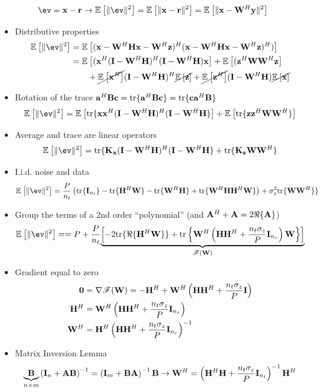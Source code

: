 \documentclass[xcolor=dvipsnames,aspectratio=169]{beamer}
\begin{document}
{    \vspace{-.1in}
    \begin{definition}
     $$\ev=\x-\rr\to\Ex{}{\|\ev\|^2}=\Ex{}{\|\x-\rr\|^2}=\Ex{}{\|\x-\W^H\y\|^2}$$
    \end{definition}
    \begin{itemize}
     \item Distributive properties
     \begin{equation*}
        \begin{split}
        \Ex{}{\|\ev\|^2}&=\Ex{}{(\x-\W^H\Hb\x-\W^H\z)^H(\x-\W^H\Hb\x-\W^H\z)^H)}\\
                        &=\Ex{}{(\x^H(\I-\W^H\Hb)^H(\I-\W^H\Hb)\x}+\Ex{}{(\z^H\W\W^H\z}\\
                        &\qquad+\cancel{\Ex{}{\x^H}}(\I-\W^H\Hb)^H\cancel{\Ex{}{\z}}+\cancel{\Ex{}{\z^H}}(\I-\W^H\Hb)\cancel{\Ex{}{\x}}\\
        \end{split}
     \end{equation*}
     \item Rotation of the trace $\mathbf{a}^H\mathbf{B}\mathbf{c}=\textnormal{tr}\{\mathbf{a}^H\mathbf{B}\mathbf{c}\}=\textnormal{tr}\{\mathbf{c}\mathbf{a}^H\mathbf{B}\}$
     $$\Ex{}{\|\ev\|^2}=\Ex{}{\tr\{\x\x^H(\I-\W^H\Hb)^H(\I-\W^H\Hb\}}+\Ex{}{\tr\{\z\z^H\W\W^H\}}$$
     \item Average and trace are linear operators
     $$\Ex{}{\|\ev\|^2}=\tr\{\K_{\x}(\I-\W^H\Hb)^H(\I-\W^H\Hb\}+\tr\{\K_{\z}\W\W^H\}$$
     \item I.i.d. noise and data 
     $$\Ex{}{\|\ev\|^2}=\frac{P}{n_t}\left(\tr\{\I_{n_t}\}-\tr\{\Hb^H\W\}-\tr\{\W^H\Hb\}+\tr\{\W^H\Hb\Hb^H\W\}\right)+\sigma_z^2\tr\{\W\W^H\}\}$$
     \item Group the terms of a 2nd order ``polynomial'' (and $\mathbf{A}^H+\mathbf{A}=2\Re\{\mathbf{A}\}$)
     $$\Ex{}{\|\ev\|^2}==P+\frac{P}{n_t}\underset{\mathscr{F}(\W)}{\underbrace{\left[-2\tr\{\Re\{\Hb^H\W\}\}+\tr\left\{\W^H\left(\Hb\Hb^H+\frac{n_t\sigma_z}{P}\I_{n_r}\right)\W\right\}\right]}}$$
     \item Gradient equal to zero
       \begin{equation*}
        \begin{split}
        \mathbf{0} &= \nabla \mathscr{F}(\mathbf{W}) =-\mathbf{H}^H+\mathbf{W}^H\left(\mathbf{H}\mathbf{H}^H+\frac{n_t\sigma_z}{P}\mathbf{I}\right)\\
                        \mathbf{H}^H&=\mathbf{W}^H\left(\mathbf{H}\mathbf{H}^H+\frac{n_t\sigma_z}{P}\mathbf{I}_{n_r}\right)\\
                        \mathbf{W}^H&=\mathbf{H}^H\left(\mathbf{H}\mathbf{H}^H+\frac{n_t\sigma_z}{P}\mathbf{I}_{n_r}\right)^{-1}\\
        \end{split}
        \end{equation*}
     \item Matrix Inversion Lemma
     $$\underset{n\times m}{\underbrace{\mathbf{B}}}\left(\mathbf{I}_{n}+\mathbf{A}\mathbf{B}\right)^{-1}=\left(\mathbf{I}_{m}+\mathbf{B}\mathbf{A}\right)^{-1}\mathbf{B}\to \mathbf{W}^H=\left(\mathbf{H}^H\mathbf{H}+\frac{n_t\sigma_z}{P}\mathbf{I}_{n_t}\right)^{-1}\mathbf{H}^H$$
    \end{itemize}
    
}
\end{document}
